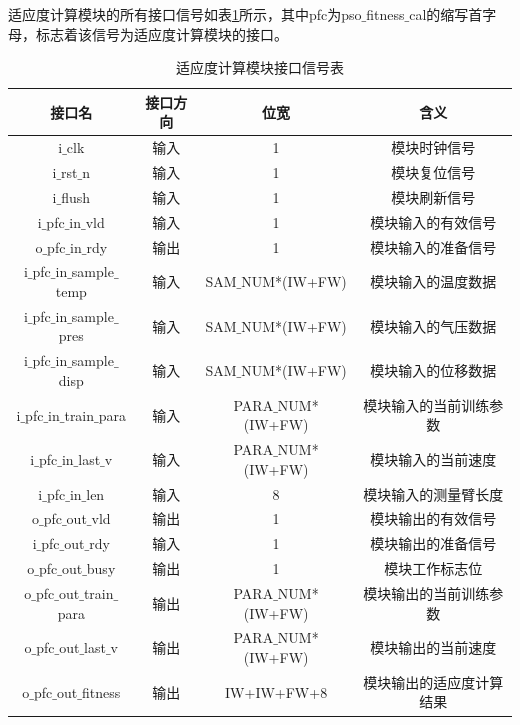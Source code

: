 适应度计算模块的所有接口信号如表\ref{tab:粒适应度计算模块接口信号表}所示，其中pfc为pso$\_$fitness$\_$cal的缩写首字母，标志着该信号为适应度计算模块的接口。
\begin{table}[H]
    \centering
    \caption{适应度计算模块接口信号表}
    \label{tab:粒适应度计算模块接口信号表}
    \begin{tabular}{c|c|c|c}
        \hline
        接口名                               & 接口方向  & 位宽               &含义                        \\ \hline
        i$\_$clk                            & 输入      & 1                     & 模块时钟信号             \\ \hline
        i$\_$rst$\_$n                       & 输入      & 1                     & 模块复位信号             \\ \hline
        i$\_$flush                          & 输入      & 1                     & 模块刷新信号             \\ \hline
        i$\_$pfc$\_$in$\_$vld               & 输入      & 1                     & 模块输入的有效信号        \\ \hline
        o$\_$pfc$\_$in$\_$rdy               & 输出      & 1                     & 模块输入的准备信号        \\ \hline
        i$\_$pfc$\_$in$\_$sample$\_$temp    & 输入      & SAM$\_$NUM*(IW+FW)    & 模块输入的温度数据        \\ \hline
        i$\_$pfc$\_$in$\_$sample$\_$pres    & 输入      & SAM$\_$NUM*(IW+FW)    & 模块输入的气压数据        \\ \hline
        i$\_$pfc$\_$in$\_$sample$\_$disp    & 输入      & SAM$\_$NUM*(IW+FW)    & 模块输入的位移数据        \\ \hline
        i$\_$pfc$\_$in$\_$train$\_$para     & 输入      & PARA$\_$NUM*(IW+FW)   & 模块输入的当前训练参数     \\ \hline
        i$\_$pfc$\_$in$\_$last$\_$v         & 输入      & PARA$\_$NUM*(IW+FW)   & 模块输入的当前速度        \\ \hline
        i$\_$pfc$\_$in$\_$len               & 输入      & 8                     & 模块输入的测量臂长度      \\ \hline
        o$\_$pfc$\_$out$\_$vld              & 输出      & 1                     & 模块输出的有效信号        \\ \hline
        i$\_$pfc$\_$out$\_$rdy              & 输入      & 1                     & 模块输出的准备信号        \\ \hline
        o$\_$pfc$\_$out$\_$busy             & 输出      & 1                     & 模块工作标志位            \\ \hline
        o$\_$pfc$\_$out$\_$train$\_$para    & 输出      & PARA$\_$NUM*(IW+FW)   & 模块输出的当前训练参数     \\ \hline
        o$\_$pfc$\_$out$\_$last$\_$v        & 输出      & PARA$\_$NUM*(IW+FW)   & 模块输出的当前速度         \\ \hline
        o$\_$pfc$\_$out$\_$fitness          & 输出      & IW+IW+FW+8            & 模块输出的适应度计算结果    \\ \hline
    \end{tabular}
  \end{table}

